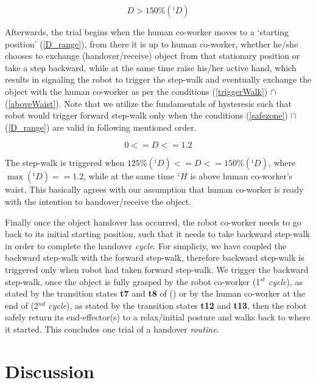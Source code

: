 \begin{equation}\label{safezone}
D > 150\% ({}^{i}D) 
\end{equation}


Afterwards, the trial begins when the human co-worker moves to a `starting position' (\ref{D_range}), from there it is up to human co-worker, whether he/she chooses to exchange (handover/receive) object from that stationary position or take a step backward, while at the same time raise his/her active hand, which results in signaling the robot to trigger the step-walk and eventually exchange the object with the human co-worker as per the conditions (\ref{triggerWalk}) $\cap$ (\ref{aboveWaist}). Note that we utilize the fundamentals of hysteresis such that robot would trigger forward step-walk only when the conditions (\ref{safezone}) $\cap$ (\ref{D_range}) are valid in following mentioned order.


\begin{equation}\label{D_range}
0 <= D <= 1.2
\end{equation}


The step-walk is triggered when $ 125\%({}^{i}D) <= D <= 150\%({}^{i}D) $, where $ \max({}^{i}D)  == 1.2 $, while at the same time $ {}^{z}H $ is above human co-worker's waist. This basically agrees with our assumption that human co-worker is ready with the intention to handover/receive the object.

Finally once the object handover has occurred, the robot co-worker needs to go back to its initial starting position, such that it needs to take backward step-walk in order to complete the handover \textit{cycle}. For simpliciy, we have coupled the backward step-walk with the forward step-walk, therefore backward step-walk is triggered only when robot had taken forward step-walk. We trigger the backward step-walk, once the object is fully grasped by the robot co-worker (1$ {}^{st} $ \textit{cycle}), as stated by the transition states \textbf{t7} and \textbf{t8} of () or by the human co-worker at the end of (2$ {}^{nd} $ \textit{cycle}), as stated by the transition states \textbf{t12} and \textbf{t13}, then the robot safely return its end-effector(s) to a relax/initial posture and walks back to where it started. This concludes one trial of a handover \textit{routine}.

\clearpage

\section{Discussion}


